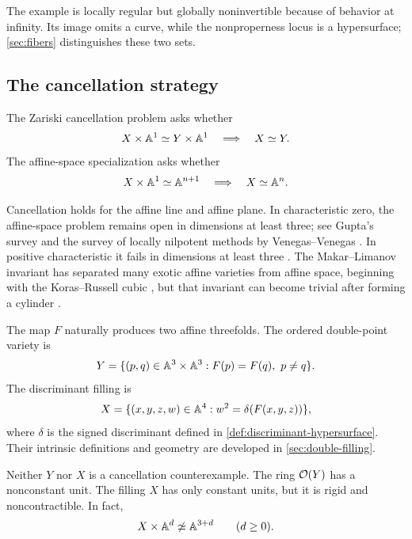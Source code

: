 The example is locally regular but globally noninvertible because of behavior at infinity.  Its image omits a curve, while the nonproperness locus is a hypersurface; \cref{sec:fibers} distinguishes these two sets.

\subsection{The cancellation strategy}

\begin{problem}\label{prob:zariski-cancellation}
The Zariski cancellation problem asks whether
\[
  X\times\mathbb A^1\simeq Y\times\mathbb A^1
  \quad\Longrightarrow\quad
  X\simeq Y.
\]
The affine-space specialization asks whether
\[
  X\times\mathbb A^1\simeq\mathbb A^{n+1}
  \quad\Longrightarrow\quad
  X\simeq\mathbb A^n.
\]
\end{problem}

\begin{historicalnote}\label{hist:cancellation-status}
Cancellation holds for the affine line and affine plane.  In characteristic zero, the affine-space problem remains open in dimensions at least three; see Gupta's survey and the survey of locally nilpotent methods by Venegas--Venegas \cite{Gupta2022,VenegasVenegas2025}.  In positive characteristic it fails in dimensions at least three \cite{Gupta2014}.  The Makar--Limanov invariant has separated many exotic affine varieties from affine space, beginning with the Koras--Russell cubic \cite{MakarLimanov1996,KalimanMakarLimanov1997}, but that invariant can become trivial after forming a cylinder \cite{Dubouloz2009}.
\end{historicalnote}

\begin{construction}\label{con:cancellation-candidates}
The map $F$ naturally produces two affine threefolds.  The ordered double-point variety is
\[
  Y=\{(p,q)\in\mathbb A^3\times\mathbb A^3:F(p)=F(q),\ p\ne q\}.
\]
The discriminant filling is
\[
  X=\{(x,y,z,w)\in\mathbb A^4:w^2=\delta(F(x,y,z))\},
\]
where $\delta$ is the signed discriminant defined in \cref{def:discriminant-hypersurface}.  Their intrinsic definitions and geometry are developed in \cref{sec:double-filling}.
\end{construction}

\begin{observation}\label{obs:cancellation-outcome}
Neither $Y$ nor $X$ is a cancellation counterexample.  The ring $\mathcal O(Y)$ has a nonconstant unit.  The filling $X$ has only constant units, but it is rigid and noncontractible.  In fact,
\[
  X\times\mathbb A^d\not\simeq\mathbb A^{3+d}
  \qquad(d\geq0).
\]
\end{observation}

